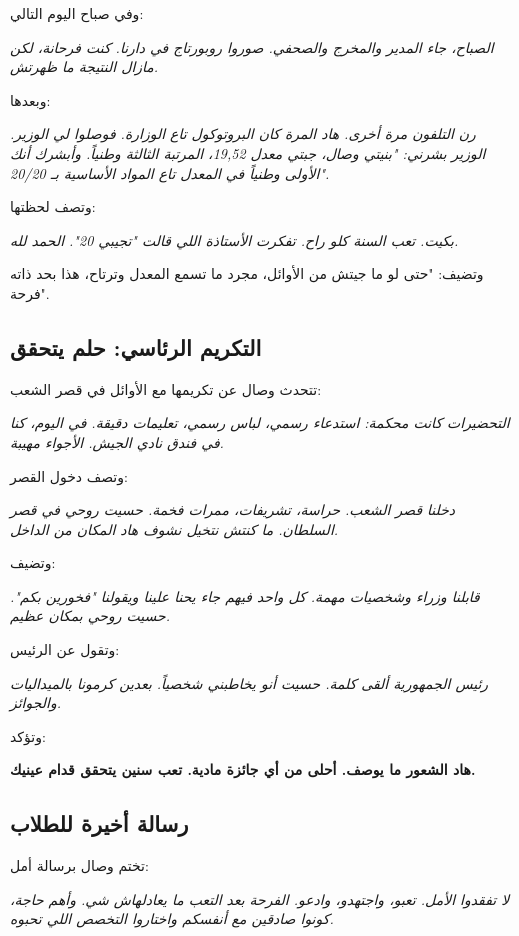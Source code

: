 \documentclass[12pt,a4paper]{book}
\newcommand{\quoteAr}[1]{%
	\begin{myquote}
		\itshape #1
	\end{myquote}
}
\newcommand{\importantAr}[1]{%
	\begin{important}
		\bfseries #1
	\end{important}
}
\begin{document}
	وفي صباح اليوم التالي:
	
	\quoteAr{الصباح، جاء المدير والمخرج والصحفي. صوروا روبورتاج في دارنا. كنت فرحانة، لكن مازال النتيجة ما ظهرتش.}
	
	وبعدها:
	
	\quoteAr{رن التلفون مرة أخرى. هاد المرة كان البروتوكول تاع الوزارة. فوصلوا لي الوزير. الوزير بشرني: "بنيتي وصال، جبتي معدل 19,52، المرتبة الثالثة وطنياً. وأبشرك أنك الأولى وطنياً في المعدل تاع المواد الأساسية بـ 20/20".}
	
	وتصف لحظتها:
	
	\quoteAr{بكيت. تعب السنة كلو راح. تفكرت الأستاذة اللي قالت "تجيبي 20". الحمد لله.}
	
	وتضيف: "حتى لو ما جيتش من الأوائل، مجرد ما تسمع المعدل وترتاح، هذا بحد ذاته فرحة".
	
	\subsection{التكريم الرئاسي: حلم يتحقق}
	
	تتحدث وصال عن تكريمها مع الأوائل في قصر الشعب:
	
	\quoteAr{التحضيرات كانت محكمة: استدعاء رسمي، لباس رسمي، تعليمات دقيقة. في اليوم، كنا في فندق نادي الجيش. الأجواء مهيبة.}
	
	وتصف دخول القصر:
	
	\quoteAr{دخلنا قصر الشعب. حراسة، تشريفات، ممرات فخمة. حسيت روحي في قصر السلطان. ما كنتش نتخيل نشوف هاد المكان من الداخل.}
	
	وتضيف:
	
	\quoteAr{قابلنا وزراء وشخصيات مهمة. كل واحد فيهم جاء يحنا علينا ويقولنا "فخورين بكم". حسيت روحي بمكان عظيم.}
	
	وتقول عن الرئيس:
	
	\quoteAr{رئيس الجمهورية ألقى كلمة. حسيت أنو يخاطبني شخصياً. بعدين كرمونا بالميداليات والجوائز.}
	
	وتؤكد:
	
	\importantAr{هاد الشعور ما يوصف. أحلى من أي جائزة مادية. تعب سنين يتحقق قدام عينيك.}
	
	\subsection{رسالة أخيرة للطلاب}
	
	تختم وصال برسالة أمل:
	
	\quoteAr{لا تفقدوا الأمل. تعبو، واجتهدو، وادعو. الفرحة بعد التعب ما يعادلهاش شي. وأهم حاجة، كونوا صادقين مع أنفسكم واختاروا التخصص اللي تحبوه.}
	
\end{document}
